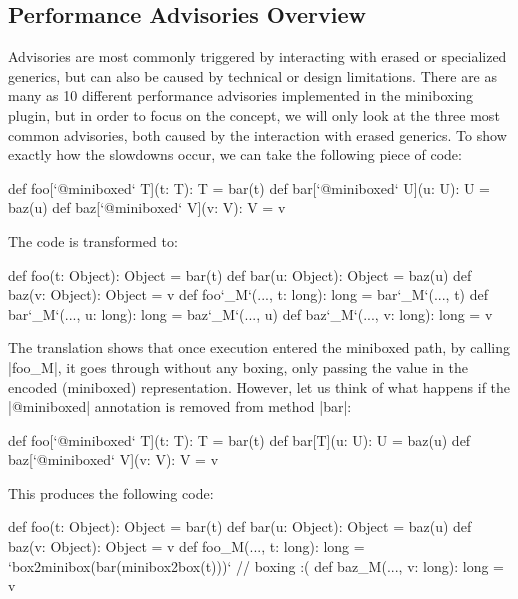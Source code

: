 \subsection{Performance Advisories Overview}

Advisories are most commonly triggered by interacting with erased or specialized generics, but can also be caused by technical or design limitations. There are as many as 10 different performance advisories implemented in the miniboxing plugin, but in order to focus on the concept, we will only look at the three most common advisories, both caused by the interaction with erased generics. To show exactly how the slowdowns occur, we can take the following piece of code:

\begin{lstlisting-nobreak}
 def foo[`@miniboxed` T](t: T): T = bar(t)
 def bar[`@miniboxed` U](u: U): U = baz(u)
 def baz[`@miniboxed` V](v: V): V = v
\end{lstlisting-nobreak}

The code is transformed to:

\begin{lstlisting-nobreak}
 def foo(t: Object): Object = bar(t)
 def bar(u: Object): Object = baz(u)
 def baz(v: Object): Object = v
 def foo`_M`(..., t: long): long = bar`_M`(..., t)
 def bar`_M`(..., u: long): long = baz`_M`(..., u)
 def baz`_M`(..., v: long): long = v
\end{lstlisting-nobreak}

The translation shows that once execution entered the miniboxed path, by calling |foo_M|, it goes through without any boxing, only passing the value in the encoded (miniboxed) representation. However, let us think of what happens if the |@miniboxed| annotation is removed from method |bar|:

\begin{lstlisting-nobreak}
 def foo[`@miniboxed` T](t: T): T = bar(t)
 def bar[T](u: U): U = baz(u)
 def baz[`@miniboxed` V](v: V): V = v
\end{lstlisting-nobreak}

This produces the following code:

\begin{lstlisting-nobreak}
 def foo(t: Object): Object = bar(t)
 def bar(u: Object): Object = baz(u)
 def baz(v: Object): Object = v
 def foo_M(..., t: long): long = `box2minibox(bar(minibox2box(t)))` // boxing :(
 def baz_M(..., v: long): long = v
\end{lstlisting-nobreak}

